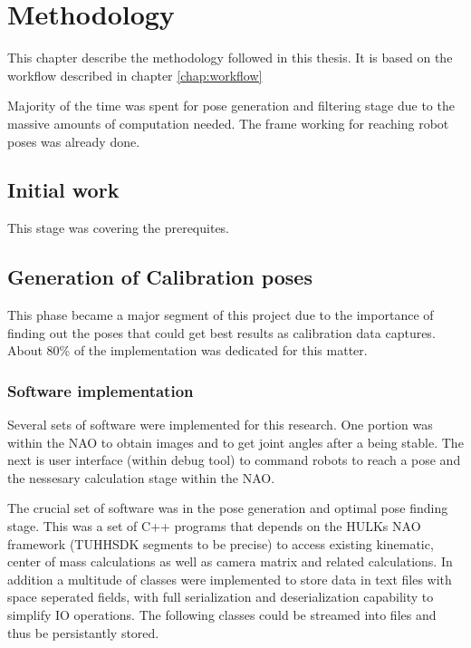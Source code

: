\documentclass[english, printversion, nomenclature, notitle]{tuvisionthesis} %
\begin{document}
\chapter{Methodology}
\label{chap:methodology}
This chapter describe the methodology followed in this thesis. It is based on the workflow described in chapter \cref{chap:workflow}

Majority of the time was spent for pose generation and filtering stage due to the massive amounts of computation needed. The frame working for reaching robot poses was already done. 

\section{Initial work}

This stage was covering the prerequites.

\section{Generation of Calibration poses}
This phase became a major segment of this project due to the importance of finding out the poses that could get best results as calibration data captures. About 80\% of the implementation was dedicated for this matter.

\subsection{Software implementation}

Several sets of software were implemented for this research. One portion was within the NAO to obtain images and to get joint angles after a being stable. The next is user interface (within debug tool) to command robots to reach a pose and the nessesary calculation stage within the NAO.

The crucial set of software was in the pose generation and optimal pose finding stage. This was a set of C++ programs that depends on the HULKs NAO framework (TUHHSDK segments to be precise) to access existing kinematic, center of mass calculations as well as camera matrix and related calculations. In addition a multitude of classes were implemented to store data in text files with space seperated fields, with full serialization and deserialization capability to simplify IO operations. The following classes could be streamed into files and thus be persistantly stored.
\end{document}
